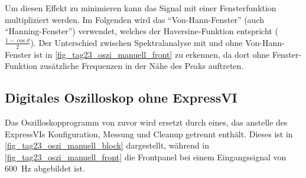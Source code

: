\documentclass[
a4paper,
12pt,
pagesize,
ngerman
]{scrartcl}
\begin{document}
	Um diesen Effekt zu minimieren kann das Signal mit einer Fensterfunktion multipliziert werden. %
	Im Folgenden wird das \enquote{Von-Hann-Fenster} (auch \enquote{Hanning-Fenster}) verwendet, welches der Haversine-Funktion entspricht ($\frac{1-\cos \vartheta}{2} $). %
	Der Unterschied zwischen Spektralanalyse mit und ohne Von-Hann-Fenster ist in \cref{fig_tag23_oszi_manuell_front} zu erkennen, da dort ohne Fenster-Funktion zusätzliche Frequenzen in der Nähe des Peaks auftreten.
	

	\subsection{Digitales Oszilloskop ohne ExpressVI} %
	Das Oszilloskopprogramm von zuvor wird ersetzt durch eines, das anstelle des ExpressVIs Konfiguration, Messung und Cleanup getrennt enthält.
	Dieses ist in \cref{fig_tag23_oszi_manuell_block} dargestellt, während in \cref{fig_tag23_oszi_manuell_front} die Frontpanel bei einem Eingangssignal von \SI{600}{\hertz} abgebildet ist.
	
\end{document}
